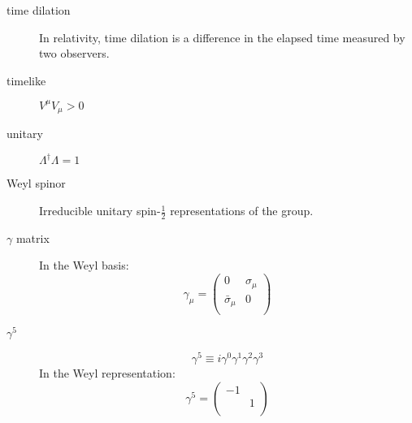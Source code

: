 \begin{description}
    \item [time dilation] In relativity, time dilation is a difference in 
	the elapsed time measured by two observers.
    \item [timelike]	$V^\mu V_\mu > 0$

    \item [unitary] $\Lambda^{\dag}\Lambda = 1$

    \item [Weyl spinor] Irreducible unitary spin-$\frac{1}{2}$
	representations of the \Poincare{} group.

    \item [$\gamma$ matrix]
	In the Weyl basis:
	\[  \gamma_\mu = 
	    \begin{pmatrix}
		0   & \sigma_\mu    \\
		\bar{\sigma}_\mu  & 0	\\
	    \end{pmatrix} 
	\]
    \item [$\gamma^5$]
	\[
	    \gamma^5 \equiv i\gamma^0\gamma^1\gamma^2\gamma^3
	\]
	In the Weyl representation:
	\[
	    \gamma^5 = 
	    \begin{pmatrix}
		-\mathcal{1}	&   \\
		    & \mathcal{1}   \\
	    \end{pmatrix}
	\]
\end{description}
